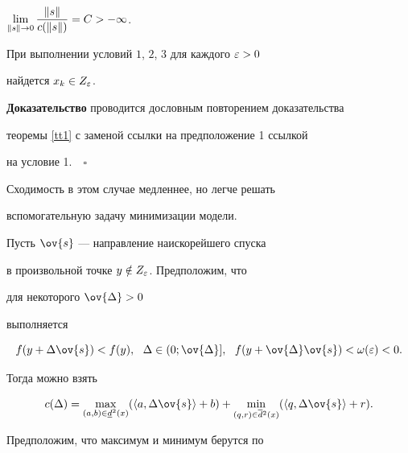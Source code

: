 \begin{cond}


$\lim\limits_{\|s\| \rar 0} \displaystyle{\frac{\|s\|}{c(\|s\|)}}=C >


-\infty$.


\end{cond}





\begin{thms} При выполнении условий $1$, $2$, $3$ для каждого $\varepsilon>0$


найдется $x_k \in Z_\varepsilon$.


\end{thms}





{\bf Доказательство} проводится дословным повторением доказательства


теоремы \ref{tt1} с заменой ссылки на предположение 1 ссылкой


на условие 1.$\quad\square$


\medskip





Сходимость в этом случае медленнее, но легче решать


вспомогательную задачу минимизации модели.





Пусть $\ov{s}$ --- направление наискорейшего спуска


в произвольной точке $y \notin Z_\varepsilon$. Предположим, что


для некоторого $\ov{\Delta}>0$


выполняется


$$


f(y + \Delta \ov{s}) <  f(y), \ \ \Delta \in


(0;\ov{\Delta}], \ \ f(y + \ov{\Delta} \ov{s}) < \omega (\e) <0.


$$


Тогда можно взять


$$


c(\Delta) = \max_{(a,b) \in \underline{d}^2


(x)} ( \la a , \Delta \ov{s}\ra + b) + \min_{(q,r) \in \overline{d}{}^2


(x)} (\la q,\Delta \ov{s}\ra + r).


$$


Предположим, что максимум и минимум берутся по


